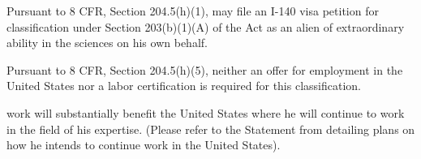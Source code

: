 Pursuant to 8 CFR, Section 204.5(h)(1), \dr may file an I-140 visa petition for
classification under Section 203(b)(1)(A) of the Act as an alien of
extraordinary ability in the sciences on his own behalf.

Pursuant to 8 CFR, Section 204.5(h)(5), neither an offer for employment in the
United States nor a labor certification is required for this classification.

\drs work will substantially benefit the United States where he
will continue to work in the field of his expertise. 
(Please refer to the Statement from \dr detailing plans on how he intends to continue work in the United States).